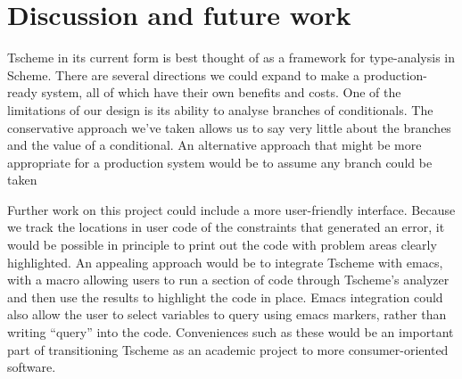\documentclass[a4paper]{article}
\begin{document}
\section{Discussion and future work}

Tscheme in its current form is best thought of as a framework for 
type-analysis in Scheme.  There are several directions we could expand to make 
a production-ready system, all of which have their own benefits and costs.  
One of the limitations of our design is its ability to analyse branches of 
conditionals.  The conservative approach we've taken allows us to say very 
little about the branches and the value of a conditional.  An alternative 
approach that might be more appropriate for a production system would be to 
assume any branch could be taken 



Further work on this project could include a more user-friendly interface.  
Because we track the locations in user code of the constraints that generated
an error, it would be possible in principle to print out the code with problem 
areas clearly highlighted.  An appealing approach would be to integrate 
Tscheme with emacs, with a macro allowing users to run a section of code 
through Tscheme's analyzer and then use the results to highlight the code in 
place.  Emacs integration could also allow the user to select variables to 
query using emacs markers, rather than writing ``query'' into the code.
Conveniences such as these would be an important part of transitioning Tscheme 
as an academic project to more consumer-oriented software.  
\end{document}
